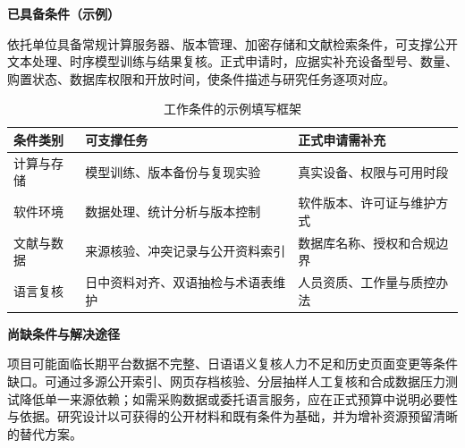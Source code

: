 \GXNSFBodyText

\noindent\textbf{已具备条件（示例）}\par
依托单位具备常规计算服务器、版本管理、加密存储和文献检索条件，可支撑公开文本处理、时序模型训练与结果复核。正式申请时，应据实补充设备型号、数量、购置状态、数据库权限和开放时间，使条件描述与研究任务逐项对应。

\begin{table}[htbp]
  \centering
  \fontsize{10}{14}\selectfont
  \caption{工作条件的示例填写框架}
  \begin{tabularx}{\textwidth}{p{}X X}
    \toprule
    条件类别 & 可支撑任务 & 正式申请需补充 \\
    \midrule
    计算与存储 & 模型训练、版本备份与复现实验 & 真实设备、权限与可用时段 \\
    软件环境 & 数据处理、统计分析与版本控制 & 软件版本、许可证与维护方式 \\
    文献与数据 & 来源核验、冲突记录与公开资料索引 & 数据库名称、授权和合规边界 \\
    语言复核 & 日中资料对齐、双语抽检与术语表维护 & 人员资质、工作量与质控办法 \\
    \bottomrule
  \end{tabularx}
  \label{tab:gx-work-condition}
\end{table}

\noindent\textbf{尚缺条件与解决途径}\par
项目可能面临长期平台数据不完整、日语语义复核人力不足和历史页面变更等条件缺口。可通过多源公开索引、网页存档核验、分层抽样人工复核和合成数据压力测试降低单一来源依赖；如需采购数据或委托语言服务，应在正式预算中说明必要性与依据。研究设计以可获得的公开材料和既有条件为基础，并为增补资源预留清晰的替代方案。
